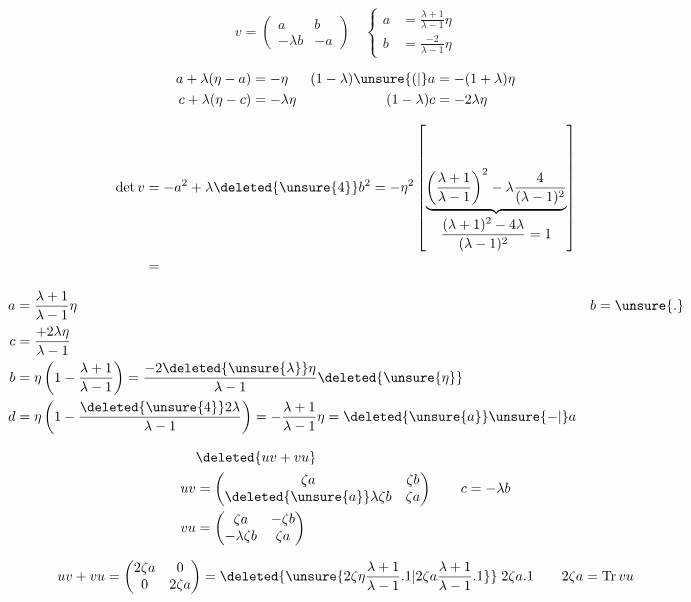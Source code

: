 \[
\boxed{v=\begin{pmatrix}a&b\\-\lambda b&-a\end{pmatrix}}
\quad\left\{\begin{aligned}a&=\frac{\lambda+1}{\lambda-1}\eta\\
b&=\frac{-2}{\lambda-1}\eta\end{aligned}\right.
\]

\[
\begin{aligned}
a+\lambda(\eta-a)&=-\eta &(1-\lambda)\unsure{(|{}}a&=-(1+\lambda)\eta\\
c+\lambda(\eta-c)&=-\lambda\eta &(1-\lambda)c&=-2\lambda\eta
\end{aligned}
\]

\[
\begin{aligned}
\det v&=-a^2+\lambda \deleted{\unsure{4}}b^2=-\eta^2
\left[\underbrace{\left(\frac{\lambda+1}{\lambda-1}\right)^2-\lambda\frac{4}{(\lambda-1)^2}}_{\displaystyle\frac{(\lambda+1)^2-4\lambda}{(\lambda-1)^2}=1}\right]\\
&=
\end{aligned}
\]

\[
\begin{aligned}
a&=\frac{\lambda+1}{\lambda-1}\eta &b&=\unsure{.}\\
c&=\frac{+2\lambda\eta}{\lambda-1}\\
b&=\eta\left(1-\frac{\lambda+1}{\lambda-1}\right)=\frac{-2\deleted{\unsure{\lambda}}\eta}{\lambda-1}\deleted{\unsure{\eta}}\\
d&=\eta\left(1-\frac{\deleted{\unsure{4}}2\lambda}{\lambda-1}\right)=-\frac{\lambda+1}{\lambda-1}\eta=\deleted{\unsure{a}}\unsure{-|{}}a
\end{aligned}
\]

\[
\begin{aligned}
&\deleted{uv+vu}\\
uv&=\begin{pmatrix}\zeta a&\zeta b\\\deleted{\unsure{a}}\lambda\zeta b&\zeta a\end{pmatrix}
\qquad c=-\lambda b\\
vu&=\begin{pmatrix}\zeta a&-\zeta b\\-\lambda\zeta b&\zeta a\end{pmatrix}
\end{aligned}
\]

\[
uv+vu=\begin{pmatrix}2\zeta a&0\\0&2\zeta a\end{pmatrix}
=\deleted{\unsure{2\zeta\eta\frac{\lambda+1}{\lambda-1}.1|2\zeta a\frac{\lambda+1}{\lambda-1}.1}}\;2\zeta a.1
\qquad 2\zeta a=\operatorname{Tr}vu
\]

